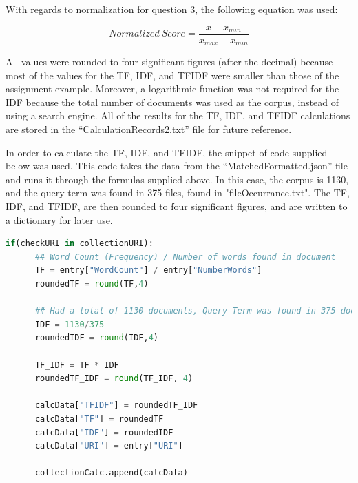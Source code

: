 \documentclass[11pt]{scrartcl} %
\begin{document}
\begin{center} \large With regards to normalization for question 3, the following equation was used: \end{center}
$$ Normalized \ Score = \frac {x - x_{min}} {x_{max} - x_{min} }$$
\small \newline

\tabto{2.0cm} All values were rounded to four significant figures (after the decimal) because most of the values for the TF, IDF, and TFIDF were smaller than those of the assignment example. \newline \newline 
\tabto{2.0cm} Moreover, a logarithmic function was not required for the IDF because the total number of documents was used as the corpus, instead of using a search engine. All of the results for the TF, IDF, and TFIDF calculations are stored in the ``CalculationRecords2.txt'' file for future reference. 
\newline

\tabto{2.0cm} In order to calculate the TF, IDF, and TFIDF, the snippet of code supplied below was used. This code takes the data from the ``MatchedFormatted.json'' file and runs it through the formulas supplied above. In this case, the corpus is 1130, and the query term was found in 375 files, found in "fileOccurrance.txt". The TF, IDF, and TFIDF, are then rounded to four significant figures, and are written to a dictionary for later use.

\begin{lstlisting}[language = Python, caption= Calculations]
if(checkURI in collectionURI):
      ## Word Count (Frequency) / Number of words found in document
      TF = entry["WordCount"] / entry["NumberWords"]
      roundedTF = round(TF,4)

      ## Had a total of 1130 documents, Query Term was found in 375 documents out of 1130
      IDF = 1130/375
      roundedIDF = round(IDF,4)
      
      TF_IDF = TF * IDF
      roundedTF_IDF = round(TF_IDF, 4)

      calcData["TFIDF"] = roundedTF_IDF
      calcData["TF"] = roundedTF
      calcData["IDF"] = roundedIDF
      calcData["URI"] = entry["URI"]

      collectionCalc.append(calcData)
\end{lstlisting}
\end{document}
